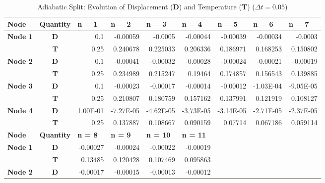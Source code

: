 \begin{table}[htbp]
  \centering
  \caption{Adiabatic Split: Evolution of Displacement ({\bf D}) and Temperature ({\bf T}) ($\Delta t = 0.05$)}
    \begin{tabular}{rcrrrrrrr}
    \toprule
    \multicolumn{1}{l}{\textbf{Node}} & \multicolumn{1}{l}{\textbf{Quantity}} & \multicolumn{1}{l}{\textbf{n = 1}} & \multicolumn{1}{l}{\textbf{n = 2}} & \multicolumn{1}{l}{\textbf{n = 3}} & \multicolumn{1}{l}{\textbf{n = 4}} & \multicolumn{1}{l}{\textbf{n = 5}} & \multicolumn{1}{l}{\textbf{n = 6}} & \multicolumn{1}{l}{\textbf{n = 7}} \\
    \midrule
    \multicolumn{1}{l}{\textbf{Node 1}} & \textbf{D} & 0.1   & -0.00059 & -0.0005 & -0.00044 & -0.00039 & -0.00034 & -0.0003 \\
          & \textbf{T} & 0.25  & 0.240678 & 0.225033 & 0.206336 & 0.186971 & 0.168253 & 0.150802 \\
    \multicolumn{1}{l}{\textbf{Node 2}} & \textbf{D} & 0.1   & -0.00041 & -0.00032 & -0.00028 & -0.00024 & -0.00021 & -0.00019 \\
          & \textbf{T} & 0.25  & 0.234989 & 0.215247 & 0.19464 & 0.174857 & 0.156543 & 0.139885 \\
    \multicolumn{1}{l}{\textbf{Node 3}} & \textbf{D} & 0.1   & -0.00023 & -0.00017 & -0.00014 & -0.00012 & -1.03E-04 & -9.05E-05 \\
          & \textbf{T} & 0.25  & 0.210807 & 0.180759 & 0.157162 & 0.137991 & 0.121919 & 0.108127 \\
    \multicolumn{1}{l}{\textbf{Node 4}} & \textbf{D} & 1.00E-01 & -7.27E-05 & -4.62E-05 & -3.73E-05 & -3.14E-05 & -2.71E-05 & -2.37E-05 \\
          & \textbf{T} & 0.25  & 0.137887 & 0.108667 & 0.090159 & 0.07714 & 0.067186 & 0.059114 \\
    \midrule
    \multicolumn{1}{l}{\textbf{Node}} & \multicolumn{1}{l}{\textbf{Quantity}} & \multicolumn{1}{l}{\textbf{n = 8}} & \multicolumn{1}{l}{\textbf{n = 9}} & \multicolumn{1}{l}{\textbf{n = 10}} & \multicolumn{1}{l}{\textbf{n = 11}} &       &       &  \\
\cmidrule{1-6}    \multicolumn{1}{l}{\textbf{Node 1}} & \textbf{D} & -0.00027 & -0.00024 & -0.00022 & -0.00019 &       &       &  \\
          & \textbf{T} & 0.13485 & 0.120428 & 0.107469 & 0.095863 &       &       &  \\
    \multicolumn{1}{l}{\textbf{Node 2}} & \textbf{D} & -0.00017 & -0.00015 & -0.00013 & -0.00012 &       &       &  \\

\end{tabular}
\end{table}
